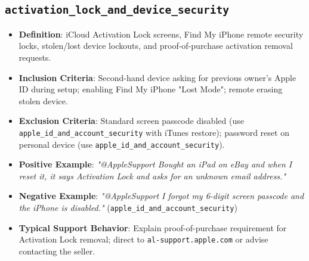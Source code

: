 \documentclass[11pt,a4paper]{article}
\begin{document}
\subsection{\texttt{activation\_lock\_and\_device\_security}}
\begin{itemize}[leftmargin=*]
    \item \textbf{Definition}: iCloud Activation Lock screens, Find My iPhone remote security locks, stolen/lost device lockouts, and proof-of-purchase activation removal requests.
    \item \textbf{Inclusion Criteria}: Second-hand device asking for previous owner's Apple ID during setup; enabling Find My iPhone "Lost Mode"; remote erasing stolen device.
    \item \textbf{Exclusion Criteria}: Standard screen passcode disabled (use \texttt{apple\_id\_and\_account\_security} with iTunes restore); password reset on personal device (use \texttt{apple\_id\_and\_account\_security}).
    \item \textbf{Positive Example}: \textit{"@AppleSupport Bought an iPad on eBay and when I reset it, it says Activation Lock and asks for an unknown email address."}
    \item \textbf{Negative Example}: \textit{"@AppleSupport I forgot my 6-digit screen passcode and the iPhone is disabled."} (\texttt{apple\_id\_and\_account\_security})
    \item \textbf{Typical Support Behavior}: Explain proof-of-purchase requirement for Activation Lock removal; direct to \texttt{al-support.apple.com} or advise contacting the seller.
\end{itemize}
\end{document}
